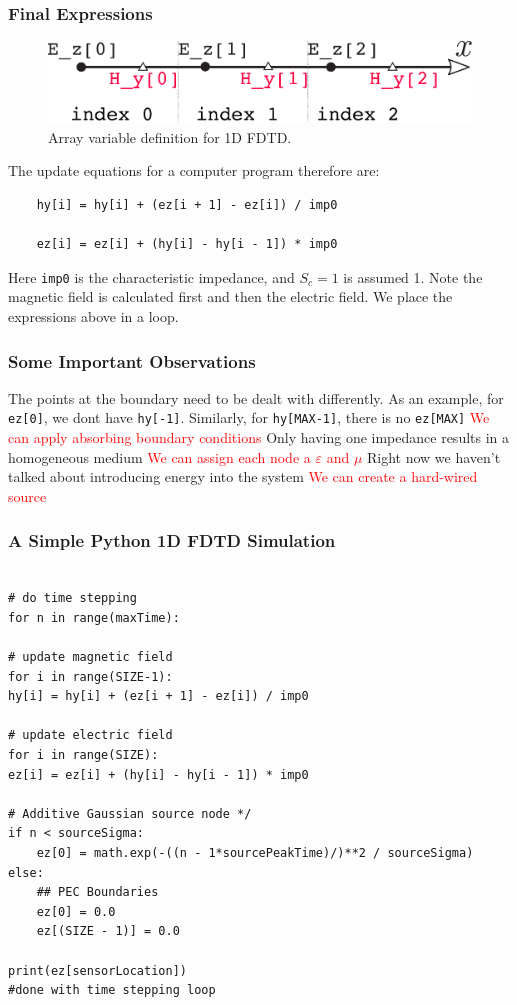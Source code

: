 \documentclass[10pt]{beamer}
\newcommand{\E}{\varepsilon}  %
\renewcommand{\u}{\mu}  %
\begin{document}
\begin{frame}[fragile]
    \frametitle{Final Expressions}
    \begin{figure}[h!]
        \centering
        \includegraphics[width=.7\textwidth]{code_fdtd_1d.pdf}
        \caption{Array variable definition for 1D FDTD.}
    \end{figure}
    The update equations for a computer program therefore are:
    \begin{verbatim}
    hy[i] = hy[i] + (ez[i + 1] - ez[i]) / imp0

    ez[i] = ez[i] + (hy[i] - hy[i - 1]) * imp0
\end{verbatim}
    Here \texttt{imp0} is the characteristic impedance, and $S_c = 1$ is assumed 1. Note the magnetic field is calculated first and then the electric field. We place the expressions above in a loop.
\end{frame}


\begin{frame}
    \frametitle{Some Important Observations}

    \begin{outline}
        \1 The points at the boundary need to be dealt with differently. As an example,
        for \texttt{ez[0]}, we dont have        \texttt{hy[-1]}.
        \2 Similarly, for \texttt{hy[MAX-1]}, there is no \texttt{ez[MAX]}
        \2 \textcolor{red}{We can apply absorbing boundary conditions}
        \1 Only having one impedance results in a homogeneous medium
        \2 \textcolor{red}{We can assign each node a $\E$ and $\u$}
        \1 Right now we haven't talked about introducing energy into the system
        \2 \textcolor{red}{We can create a hard-wired source}
    \end{outline}

\end{frame}

\begin{frame}[fragile]
    \frametitle{A Simple Python 1D FDTD Simulation}
    \scriptsize
    \begin{verbatim}

# do time stepping
for n in range(maxTime):

# update magnetic field
for i in range(SIZE-1):
hy[i] = hy[i] + (ez[i + 1] - ez[i]) / imp0

# update electric field
for i in range(SIZE):
ez[i] = ez[i] + (hy[i] - hy[i - 1]) * imp0

# Additive Gaussian source node */
if n < sourceSigma:
    ez[0] = math.exp(-((n - 1*sourcePeakTime)/)**2 / sourceSigma)
else:
    ## PEC Boundaries
    ez[0] = 0.0
    ez[(SIZE - 1)] = 0.0

print(ez[sensorLocation])
#done with time stepping loop
    \end{verbatim}

\end{frame}
\end{document}
